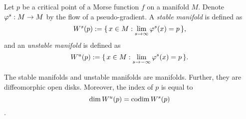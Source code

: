 \documentclass{../exp}
\begin{document}
\begin{defn}
Let $p$ be a critical point of a Morse function $f$ on a manifold $M$.
Denote $\varphi^s:M\to M$ by the flow of a pseudo-gradient.
A \emph{stable manifold} is defined as
\[W^s(p):=\{\,x\in M:\lim_{s\to\infty}\varphi^s(x)=p\,\},\]
and an \emph{unstable manifold} is defined as
\[W^u(p):=\{\,x\in M:\lim_{s\to-\infty}\varphi^s(x)=p\,\}.\]
\end{defn}
\begin{prop}
The stable manifolds and unstable manifolds are manifolds.
Further, they are diffeomorphic open disks.
Moreover, the index of $p$ is equal to
\[\dim W^u(p)=\operatorname{codim} W^s(p)\].
\end{prop}
\end{document}
